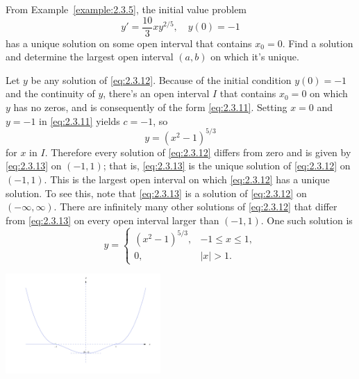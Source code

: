 \documentclass{ximera}
\begin{document}

\begin{example} \label{example:2.3.7}
From Example~\ref{example:2.3.5}, the initial value
problem
\begin{equation} \label{eq:2.3.12}
y'=\frac{10}{3}xy^{2/5}, \quad y(0)=-1
\end{equation}
 has a  unique solution on some open interval that contains $x_0=0$.
Find a solution and determine the largest open interval $(a,b)$ on
which it's unique.

\begin{explanation}
Let $y$ be any solution of \eqref{eq:2.3.12}. Because of the initial
condition $y(0)=-1$ and the continuity of $y$, there's an open interval
$I$ that contains $x_0=0$ on which $y$ has no zeros, and is consequently
of the form \eqref{eq:2.3.11}. Setting $x=0$ and $y=-1$ in \eqref{eq:2.3.11}
yields $c=-1$, so
\begin{equation} \label{eq:2.3.13}
y=(x^2-1)^{5/3}
\end{equation}
for $x$  in $I$.
Therefore every solution of \eqref{eq:2.3.12} differs from zero
and is given by \eqref{eq:2.3.13} on $(-1,1)$; that is,
\eqref{eq:2.3.13} is the unique solution of \eqref{eq:2.3.12} on
$(-1,1)$.
 This is the largest open interval on which
\eqref{eq:2.3.12} has a unique solution. To see this, note that
\eqref{eq:2.3.13} is a solution of \eqref{eq:2.3.12} on $(-\infty,\infty)$.
There are infinitely many other solutions
of \eqref{eq:2.3.12} that differ from \eqref{eq:2.3.13} on every open interval
larger than
$(-1,1)$. One such solution is
$$
y = \left\{ \begin{array}{cl}
(x^2-1)^{5/3}, & -1 \le x \le 1, \\[6pt]
0,             & |x|>1. \end{array} \right.
$$
\begin{image}
 \includegraphics[height=1.5in]{fig020303.jpg}
\end{image}



\end{explanation}
\end{example}
\end{document}
